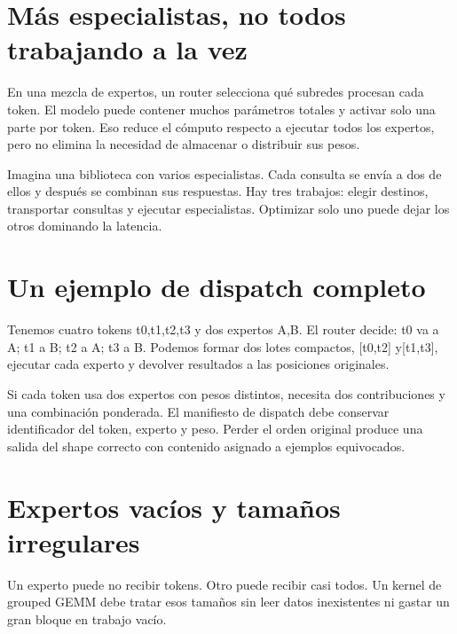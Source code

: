 \documentclass[12pt,a4paper,oneside]{report}
\begin{document}
\section{Más especialistas, no todos trabajando a la vez}
En una mezcla de expertos, un router selecciona qué subredes procesan cada token. El modelo puede contener muchos parámetros totales y activar solo una parte por token. Eso reduce el cómputo respecto a ejecutar todos los expertos, pero no elimina la necesidad de almacenar o distribuir sus pesos.

Imagina una biblioteca con varios especialistas. Cada consulta se envía a dos de ellos y después se combinan sus respuestas. Hay tres trabajos: elegir destinos, transportar consultas y ejecutar especialistas. Optimizar solo uno puede dejar los otros dominando la latencia.

\section{Un ejemplo de dispatch completo}
Tenemos cuatro tokens t0,t1,t2,t3 y dos expertos A,B. El router decide: t0 va a A; t1 a B; t2 a A; t3 a B. Podemos formar dos lotes compactos, [t0,t2] y[t1,t3], ejecutar cada experto y devolver resultados a las posiciones originales.

Si cada token usa dos expertos con pesos distintos, necesita dos contribuciones y una combinación ponderada. El manifiesto de dispatch debe conservar identificador del token, experto y peso. Perder el orden original produce una salida del shape correcto con contenido asignado a ejemplos equivocados.

\begin{center}
\end{center}
\section{Expertos vacíos y tamaños irregulares}
Un experto puede no recibir tokens. Otro puede recibir casi todos. Un kernel de grouped GEMM debe tratar esos tamaños sin leer datos inexistentes ni gastar un gran bloque en trabajo vacío.
\end{document}
